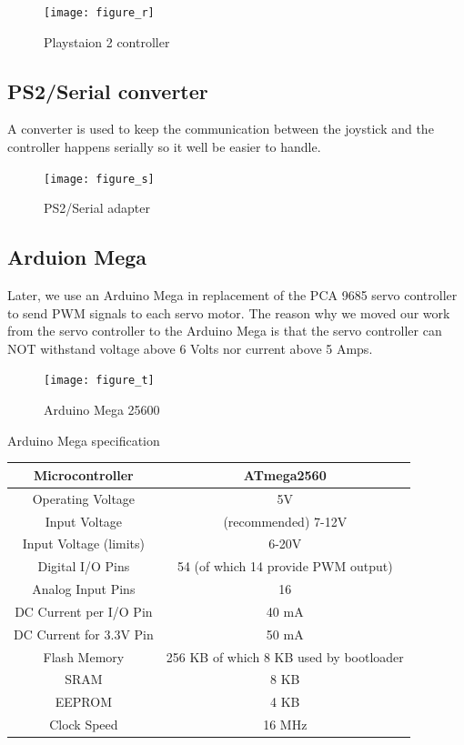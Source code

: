 \begin{figure}[H]
	\centering
	\texttt{[image: figure\_r]}
	\caption{Playstaion 2 controller}
	\label{figure_r}
\end{figure}

\subsection{PS2/Serial converter}
A converter is used to keep the communication between the joystick and the controller happens serially so it well be easier to handle.

\begin{figure}[H]
	\centering
	\texttt{[image: figure\_s]}
	\caption{PS2/Serial adapter}
	\label{figure_s}
\end{figure}

\subsection{Arduion Mega}
Later, we use an Arduino Mega in replacement of the PCA 9685 servo controller to send PWM signals to each servo motor. The reason why we moved our work from the servo controller to the Arduino Mega is that the servo controller can NOT withstand voltage above 6 Volts nor current above 5 Amps.

\begin{figure}[H]
	\centering
	\texttt{[image: figure\_t]}
	\caption{Arduino Mega 25600}
	\label{figure_t}
\end{figure}

	 Arduino Mega specification
\begin{center}
	\begin{tabular}{ |c|c|}
		\hline
		Microcontroller			& ATmega2560 \\ \hline
		Operating Voltage		& 5V\\ \hline
		Input Voltage			& (recommended) 7-12V\\ \hline
		Input Voltage (limits) 	& 6-20V\\ \hline
		Digital I/O Pins 		& 54 (of which 14 provide PWM output)\\ \hline
		Analog Input Pins 		& 16\\ \hline
		DC Current per I/O Pin	& 40 mA\\ \hline
		DC Current for 3.3V Pin & 50 mA\\ \hline
		Flash Memory			& 256 KB of which 8 KB used by bootloader\\ \hline
		SRAM					& 8 KB\\ \hline
		EEPROM 					& 4 KB\\ \hline
		Clock Speed 			& 16 MHz\\ \hline
	\end{tabular}
\end{center}

